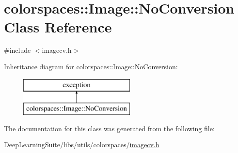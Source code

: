 \hypertarget{classcolorspaces_1_1_image_1_1_no_conversion}{}\section{colorspaces\+:\+:Image\+:\+:No\+Conversion Class Reference}
\label{classcolorspaces_1_1_image_1_1_no_conversion}


{\ttfamily \#include $<$imagecv.\+h$>$}

Inheritance diagram for colorspaces\+:\+:Image\+:\+:No\+Conversion\+:\begin{figure}[H]
\begin{center}
\leavevmode
\includegraphics[height=2.000000cm]{classcolorspaces_1_1_image_1_1_no_conversion}
\end{center}
\end{figure}


The documentation for this class was generated from the following file\+:\begin{DoxyCompactItemize}
\item 
Deep\+Learning\+Suite/libs/utils/colorspaces/\hyperlink{imagecv_8h}{imagecv.\+h}\end{DoxyCompactItemize}

